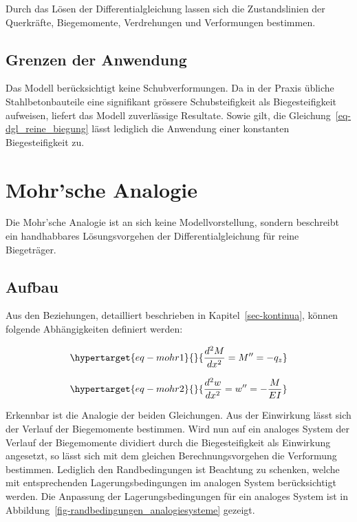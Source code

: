 \documentclass[
  12pt,
  letterpaper,
  egregdoesnotlikesansseriftitles]{scrreprt}
\begin{document}
Durch das Lösen der Differentialgleichung lassen sich die Zustandslinien
der Querkräfte, Biegemomente, Verdrehungen und Verformungen bestimmen.

\hypertarget{grenzen-der-anwendung}{%
\subsection{Grenzen der Anwendung}\label{grenzen-der-anwendung}}

Das Modell berücksichtigt keine Schubverformungen. Da in der Praxis
übliche Stahlbetonbauteile eine signifikant grössere Schubsteifigkeit
als Biegesteifigkeit aufweisen, liefert das Modell zuverlässige
Resultate. Sowie gilt, die Gleichung~\ref{eq-dgl_reine_biegung} lässt
lediglich die Anwendung einer konstanten Biegesteifigkeit zu.

\hypertarget{sec-mohrsche_analogie}{%
\section{Mohr'sche Analogie}\label{sec-mohrsche_analogie}}

Die Mohr'sche Analogie ist an sich keine Modellvorstellung, sondern
beschreibt ein handhabbares Lösungsvorgehen der Differentialgleichung
für reine Biegeträger.

\hypertarget{aufbau-1}{%
\subsection{Aufbau}\label{aufbau-1}}

Aus den Beziehungen, detailliert beschrieben in
Kapitel~\ref{sec-kontinua}, können folgende Abhängigkeiten definiert
werden:

\begin{equation}\protect\hypertarget{eq-mohr1}{}{
\frac{d^2M}{dx^2} = M'' = -q_z
}\label{eq-mohr1}\end{equation}

\begin{equation}\protect\hypertarget{eq-mohr2}{}{
\frac{d^2w}{dx^2} = w'' = -\frac{M}{EI}
}\label{eq-mohr2}\end{equation}

Erkennbar ist die Analogie der beiden Gleichungen. Aus der Einwirkung
lässt sich der Verlauf der Biegemomente bestimmen. Wird nun auf ein
analoges System der Verlauf der Biegemomente dividiert durch die
Biegesteifigkeit als Einwirkung angesetzt, so lässt sich mit dem
gleichen Berechnungsvorgehen die Verformung bestimmen. Lediglich den
Randbedingungen ist Beachtung zu schenken, welche mit entsprechenden
Lagerungsbedingungen im analogen System berücksichtigt werden. Die
Anpassung der Lagerungsbedingungen für ein analoges System ist in
Abbildung~\ref{fig-randbedingungen_analogiesysteme} gezeigt.
\end{document}
